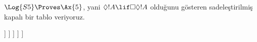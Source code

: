 \documentclass[../../../include/open-logic-section]{subfiles}
\begin{document}
\begin{ex}
  $\Log{S5} \Proves \Ax{5}$, yani $\Diamond!A \lif \Box\Diamond!A$
  olduğunu gösteren sadeleştirilmiş kapalı bir tablo veriyoruz.
  \begin{oltableau}
    [\pFmla{\False}{\Diamond\formula{A} \lif \Box\Diamond \formula{A}}{1},
      just = \TAss
      [\pFmla{\True}{\Diamond \formula{A}}{1}, just = {\TRule{\False}{\lif}[1]}
        [\pFmla{\False}{\Box\Diamond \formula{A}}{1},
          just = {\TRule{\False}{\lif}[1]}
          [\pFmla{\False}{\Diamond \formula{A}}{2},
            just = {\TRule{\False}{\Box}[3]}
            [\pFmla{\True}{\formula{A}}{3},
              just = {\TRule{\True}{\Diamond}[2]}
                [\pFmla{\False}{\formula{A}}{3},
                  just = {\TRule{\False}{\Diamond}[4]}, close]
            ]
          ]
        ]
      ]
    ]
  \end{oltableau}
\end{ex}
\end{document}
